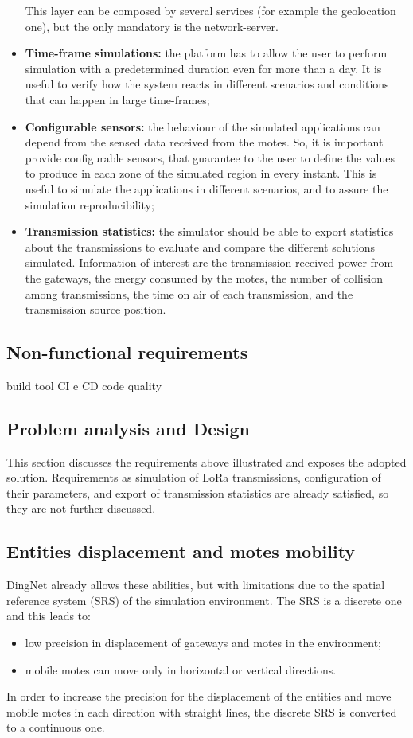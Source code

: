 \begin{itemize}
    This layer can be composed by several services (for example the geolocation one), but the only mandatory is the network-server.
    \item \textbf{Time-frame simulations:} the platform has to allow the user to perform simulation with a predetermined duration even for more than a day. It is useful to verify how the system reacts in different scenarios and conditions that can happen in large time-frames; 
    \item \textbf{Configurable sensors:} the behaviour of the simulated applications can depend from the sensed data received from the motes. So, it is important provide configurable sensors, that guarantee to the user to define the values to produce in each zone of the simulated region in every instant.
    This is useful to simulate the applications in different scenarios, and to assure the simulation reproducibility;
    \item \textbf{Transmission statistics:} the simulator should be able to export statistics about the transmissions to evaluate and compare the different solutions simulated. Information of interest are the transmission received power from the gateways, the energy consumed by the motes, the number of collision among transmissions, the time on air of each transmission, and the transmission source position.
\end{itemize}

\subsection*{Non-functional requirements}

build tool
CI e CD
code quality

\subsection{Problem analysis and Design}

This section discusses the requirements above illustrated and exposes the adopted solution. 
Requirements as simulation of LoRa transmissions, configuration of their parameters, and export of transmission statistics are already satisfied, so they are not further discussed.

\subsection*{Entities displacement and motes mobility}
DingNet already allows these abilities, but with limitations due to the spatial reference system (SRS) of the simulation environment. The SRS is a discrete one and this leads to:
\begin{itemize}
    \item low precision in displacement of gateways and motes in the environment;
    \item mobile motes can move only in horizontal or vertical directions. 
\end{itemize}  
In order to increase the precision for the displacement of the entities and move mobile motes in each direction with straight lines, the discrete SRS is converted to a continuous one. 

